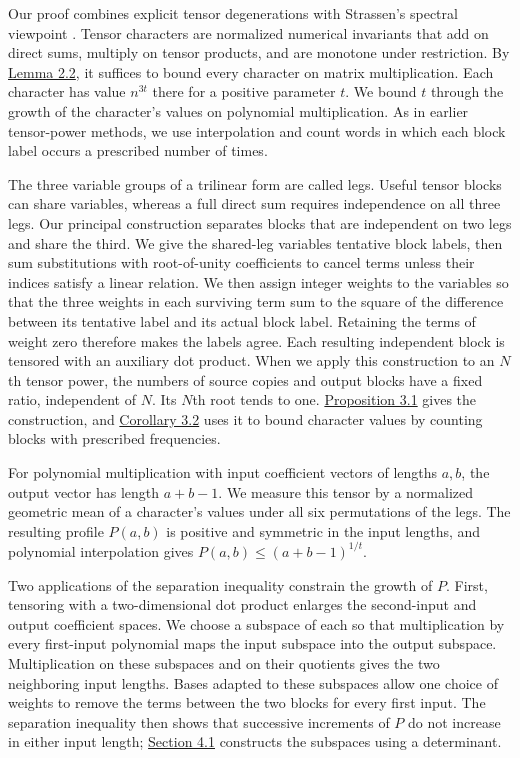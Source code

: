 Our proof combines explicit tensor degenerations with Strassen's spectral viewpoint \cite{r16,r4}. Tensor characters are normalized numerical invariants that add on direct sums, multiply on tensor products, and are monotone under restriction. By \hyperlink{p107.result.2.2}{Lemma 2.2}, it suffices to bound every character on matrix multiplication. Each character has value $n^{3t}$ there for a positive parameter $t$. We bound $t$ through the growth of the character's values on polynomial multiplication. As in earlier tensor-power methods, we use interpolation and count words in which each block label occurs a prescribed number of times.

The three variable groups of a trilinear form are called legs. Useful tensor blocks can share variables, whereas a full direct sum requires independence on all three legs. Our principal construction separates blocks that are independent on two legs and share the third. We give the shared-leg variables tentative block labels, then sum substitutions with root-of-unity coefficients to cancel terms unless their indices satisfy a linear relation. We then assign integer weights to the variables so that the three weights in each surviving term sum to the square of the difference between its tentative label and its actual block label. Retaining the terms of weight zero therefore makes the labels agree. Each resulting independent block is tensored with an auxiliary dot product. When we apply this construction to an $N$th tensor power, the numbers of source copies and output blocks have a fixed ratio, independent of $N$. Its $N$th root tends to one. \hyperlink{p107.result.3.1}{Proposition 3.1} gives the construction, and \hyperlink{p107.result.3.2}{Corollary 3.2} uses it to bound character values by counting blocks with prescribed frequencies.

For polynomial multiplication with input coefficient vectors of lengths $a,b$, the output vector has length $a+b-1$. We measure this tensor by a normalized geometric mean of a character's values under all six permutations of the legs. The resulting profile $P(a,b)$ is positive and symmetric in the input lengths, and polynomial interpolation gives $P(a,b)\le(a+b-1)^{1/t}$.

Two applications of the separation inequality constrain the growth of $P$. First, tensoring with a two-dimensional dot product enlarges the second-input and output coefficient spaces. We choose a subspace of each so that multiplication by every first-input polynomial maps the input subspace into the output subspace. Multiplication on these subspaces and on their quotients gives the two neighboring input lengths. Bases adapted to these subspaces allow one choice of weights to remove the terms between the two blocks for every first input. The separation inequality then shows that successive increments of $P$ do not increase in either input length; \hyperlink{p107.sec.4.1}{Section 4.1} constructs the subspaces using a determinant.

